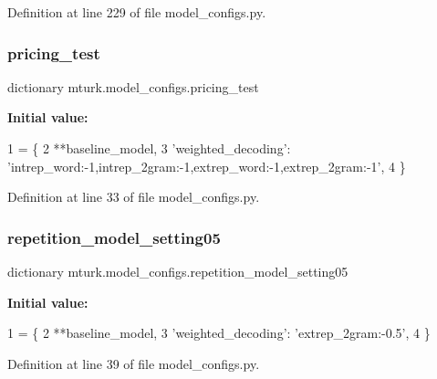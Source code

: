 Definition at line 229 of file model\+\_\+configs.\+py.

\mbox{\label{namespacemturk_1_1model__configs_a3cb0a191bf2dc8f0372d5b1ce844a5bc}} 
\subsubsection{\texorpdfstring{pricing\+\_\+test}{pricing\_test}}
{\footnotesize\ttfamily dictionary mturk.\+model\+\_\+configs.\+pricing\+\_\+test}

{\bfseries Initial value\+:}
\begin{DoxyCode}
1 =  \{
2     **baseline\_model,
3     \textcolor{stringliteral}{'weighted\_decoding'}: \textcolor{stringliteral}{'intrep\_word:-1,intrep\_2gram:-1,extrep\_word:-1,extrep\_2gram:-1'},
4 \}
\end{DoxyCode}


Definition at line 33 of file model\+\_\+configs.\+py.

\mbox{\label{namespacemturk_1_1model__configs_ac71e65f06950b79f61eb0eac2808fda6}} 
\subsubsection{\texorpdfstring{repetition\+\_\+model\+\_\+setting05}{repetition\_model\_setting05}}
{\footnotesize\ttfamily dictionary mturk.\+model\+\_\+configs.\+repetition\+\_\+model\+\_\+setting05}

{\bfseries Initial value\+:}
\begin{DoxyCode}
1 =  \{
2     **baseline\_model,
3     \textcolor{stringliteral}{'weighted\_decoding'}: \textcolor{stringliteral}{'extrep\_2gram:-0.5'},
4 \}
\end{DoxyCode}


Definition at line 39 of file model\+\_\+configs.\+py.

\mbox{\label{namespacemturk_1_1model__configs_aa88dbb7d6eee67682b8ba88f90af2012}} 
